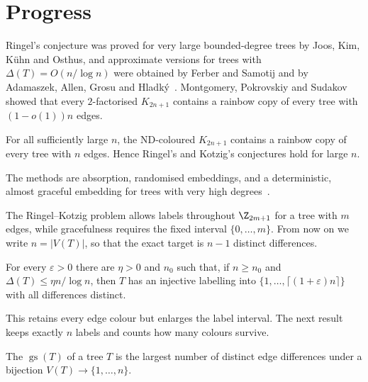 \section{Progress}\label{sec:progress}


Ringel's conjecture was proved for very large bounded-degree trees by Joos, Kim, K\"uhn and Osthus, and approximate versions for trees with $\Delta(T)=O(n/\log n)$ were obtained by Ferber and Samotij and by Adamaszek, Allen, Grosu and Hladk\'y~\cite[\S1]{mps20}. Montgomery, Pokrovskiy and Sudakov~\cite{mps18} showed that every $2$-factorised $K_{2n+1}$ contains a rainbow copy of every tree with $(1-o(1))n$ edges.

\begin{theorem}\label{thm:ringel}
For all sufficiently large $n$, the ND-coloured $K_{2n+1}$ contains a rainbow copy of every tree with $n$ edges. Hence Ringel's and Kotzig's conjectures hold for large $n$.
\end{theorem}

The methods are absorption, randomised embeddings, and a deterministic, almost graceful embedding for trees with very high degrees~\cite[\S1]{mps20}.


The Ringel--Kotzig problem allows labels throughout $\Z_{2m+1}$ for a tree with $m$ edges, while gracefulness requires the fixed interval $\{0,\dots,m\}$. From now on we write $n=|V(T)|$, so that the exact target is $n-1$ distinct differences.

\begin{theorem}\label{thm:aagh}
For every $\varepsilon>0$ there are $\eta>0$ and $n_0$ such that, if $n\geq n_0$ and $\Delta(T)\leq\eta n/\log n$, then $T$ has an injective labelling into $\{1,\dots,\lceil(1+\varepsilon)n\rceil\}$ with all differences distinct.
\end{theorem}

This retains every edge colour but enlarges the label interval. The next result keeps exactly $n$ labels and counts how many colours survive.

\begin{definition}\label{def:gracesize}
The  $\operatorname{gs}(T)$ of a tree $T$ is the largest number of distinct edge differences under a bijection $V(T)\to\{1,\dots,n\}$.
\end{definition}

